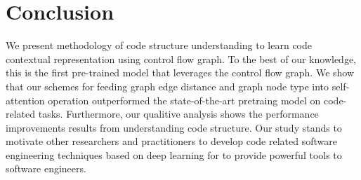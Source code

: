 \section{Conclusion}

We present methodology of code structure understanding to learn code
contextual representation using control flow graph. To the best of our
knowledge, this is the first pre-trained model that leverages the
control flow graph. We show that our schemes for feeding graph edge
distance and graph node type into \Trsfm self-attention operation
outperformed the state-of-the-art pretraing model on code-related \ds
tasks. Furthermore, our qualitive analysis shows the performance
improvements results from understanding \Cfg code structure. Our study
stands to motivate other researchers and practitioners to develop code
related software engineering techniques based on deep learning for \pl
to provide powerful tools to software engineers.
